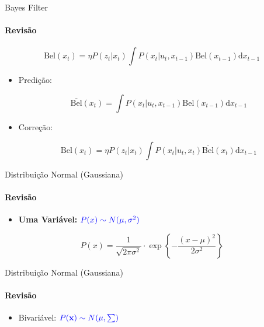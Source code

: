 \documentclass[aspectratio=169]{beamer}
\begin{document}
\begin{frame}{Bayes Filter}
    \framesubtitle{Revisão}
    
    \begin{block}{}
        \begin{equation*}
            \text{Bel}(x_t) = \eta P(z_t| x_t) \int P(x_t| u_t, x_{t-1}) \text{Bel}(x_{t-1})\text{d}x_{t-1}
        \end{equation*}
    \end{block}

    \begin{itemize}
        \item Predição:
        
        \begin{equation*}
            \overline{\text{Bel}}(x_t) = \int P(x_t| u_t, x_{t-1}) \text{Bel}(x_{t-1})\text{d}x_{t-1}
        \end{equation*}

        \item Correção:

        \begin{equation*}
            \text{Bel}(x_t) = \eta P(z_t| x_t) \int P(x_t| u_t, x_{t}) \overline{\text{Bel}}(x_{t})\text{d}x_{t-1}
        \end{equation*}
    \end{itemize}
\end{frame}


\begin{frame}{Distribuição Normal (Gaussiana)}
    \framesubtitle{Revisão}  
    \begin{itemize}
        \item \textbf{Uma Variável:} $\color{blue}{P(x) \sim N(\mu, \sigma^2)}$
    \end{itemize}
    \begin{block}{}
        \begin{equation*}
            P(x) = \dfrac{1}{\sqrt{2\pi\sigma^2}}\cdot 
        \exp\left\{-\frac{(x-\mu)^2}{2\sigma^2}\right\}
        \end{equation*}
    \end{block}
    \centering
    
\end{frame}


\begin{frame}{Distribuição Normal (Gaussiana)}
    \framesubtitle{Revisão}
    \begin{itemize}
        \item Bivariável: $\color{blue}{P(\mathbf{x}) \sim N(\mu, \textstyle\sum)}$
    \end{itemize}
    \centering
    
\end{frame}
\end{document}
